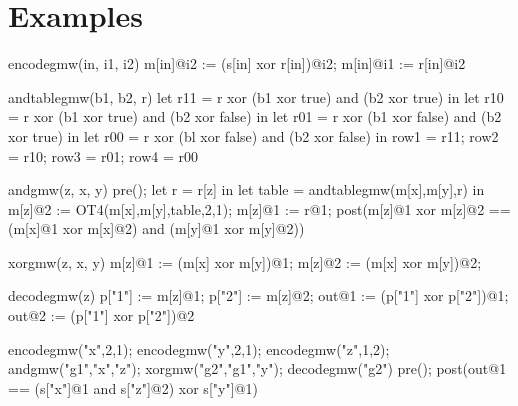 \section{Examples}

\begin{verbatimtab}
    encodegmw(in, i1, i2) {
      m[in]@i2 := (s[in] xor r[in])@i2;
      m[in]@i1 := r[in]@i2
    }
    
    andtablegmw(b1, b2, r) {
      let r11 = r xor (b1 xor true) and (b2 xor true) in
      let r10 = r xor (b1 xor true) and (b2 xor false) in
      let r01 = r xor (b1 xor false) and (b2 xor true) in
      let r00 = r xor (bl xor false) and (b2 xor false) in
      { row1 = r11; row2 = r10; row3 = r01; row4 = r00 }
    }
    
    andgmw(z, x, y) {
      pre();
      let r = r[z] in
      let table = andtablegmw(m[x],m[y],r) in
      m[z]@2 := OT4(m[x],m[y],table,2,1);
      m[z]@1 := r@1;
      post(m[z]@1 xor m[z]@2 == (m[x]@1 xor m[x]@2) and (m[y]@1 xor m[y]@2))
    }
    
    xorgmw(z, x, y) {
      m[z]@1 := (m[x] xor m[y])@1; m[z]@2 := (m[x] xor m[y])@2;
    }
    
    decodegmw(z) {
      p["1"] := m[z]@1; p["2"] := m[z]@2;
      out@1 := (p["1"] xor p["2"])@1;
      out@2 := (p["1"] xor p["2"])@2
    }

    encodegmw("x",2,1);
    encodegmw("y",2,1);
    encodegmw("z",1,2);
    andgmw("g1","x","z");
    xorgmw("g2","g1","y");
    decodegmw("g2")
    pre();
    post(out@1 == (s["x"]@1 and s["z"]@2) xor s["y"]@1)
    
\end{verbatimtab}



